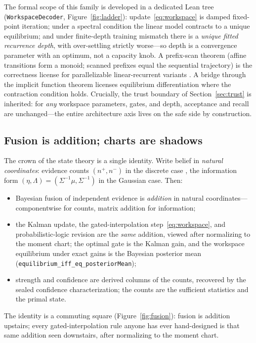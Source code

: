 \documentclass[11pt]{article}
\newcommand{\code}[1]{\texttt{#1}}
\begin{document}
The formal scope of this family is developed in a dedicated Lean tree
(\code{WorkspaceDecoder}, Figure~\ref{fig:ladder}): update~\eqref{eq:workspace} is damped
fixed-point iteration;
under a spectral condition the linear model contracts to a unique equilibrium; and under
finite-depth training mismatch there is a \emph{unique fitted recurrence depth}, with
over-settling strictly worse---so depth is a convergence parameter with an optimum, not
a capacity knob. A prefix-scan theorem (affine transitions form a monoid; scanned
prefixes equal the sequential trajectory) is the correctness license for
parallelizable linear-recurrent variants \cite{gu2023mamba}. A bridge through the
implicit function theorem licenses equilibrium differentiation \cite{bai2019deq} where
the contraction condition holds. Crucially, the trust boundary of
Section~\ref{sec:trust} is inherited: for \emph{any} workspace parameters, gates, and
depth, acceptance and recall are unchanged---the entire architecture axis lives on the
safe side by construction.

\subsection{Fusion is addition; charts are shadows}
\label{sec:fusion}

The crown of the state theory is a single identity. Write belief in \emph{natural
coordinates}: evidence counts $(n^{+},n^{-})$ in the discrete case
\cite{pln2009}, the information form $(\eta,\Lambda)=(\Sigma^{-1}\mu,\Sigma^{-1})$ in
the Gaussian case. Then:
\begin{itemize}
\item Bayesian fusion of independent evidence is \emph{addition} in natural
coordinates---componentwise for counts, matrix addition for information;
\item the Kalman update, the gated-interpolation step~\eqref{eq:workspace}, and
probabilistic-logic revision are the \emph{same} addition, viewed after normalizing to
the moment chart; the optimal gate is the Kalman gain, and the workspace equilibrium
under exact gains is the Bayesian posterior mean
(\code{equilibrium\_iff\_eq\_posteriorMean});
\item strength and confidence are derived columns of the counts, recovered by the
sealed confidence characterization; the counts are the sufficient statistics and the
primal state.
\end{itemize}
The identity is a commuting square (Figure~\ref{fig:fusion}): fusion is addition
upstairs; every gated-interpolation rule anyone has ever hand-designed is that same
addition seen downstairs, after normalizing to the moment chart.
\end{document}
